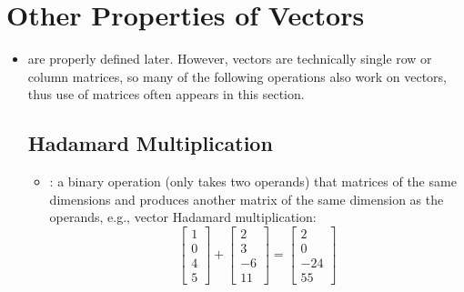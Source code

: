 \newpage
\section{Other Properties of Vectors}\label{Other Properties of Vectors}
\begin{itemize}
  \item \hyperref[Matrix Terminology]{} are properly defined later. However, vectors are technically single row or column matrices, so many of the following operations also work on vectors, thus use of matrices often appears in this section.
  
  \subsection{Hadamard Multiplication}\label{Vector Hadamard Multiplication}
  \begin{itemize}
    \item {}: a binary operation (only takes two operands) that matrices of the same dimensions and produces another matrix of the same dimension as the operands, e.g., vector Hadamard multiplication:
    \[%
    \begin{bmatrix}
      1 \\
      0 \\
      4 \\
      5 
    \end{bmatrix}
    +
    \begin{bmatrix}
      2 \\
      3 \\
      -6 \\
      11
    \end{bmatrix}
    =
    \begin{bmatrix}
      2 \\
      0 \\
      -24 \\
      55
    \end{bmatrix}
    \]%
  \end{itemize}


\end{itemize}
